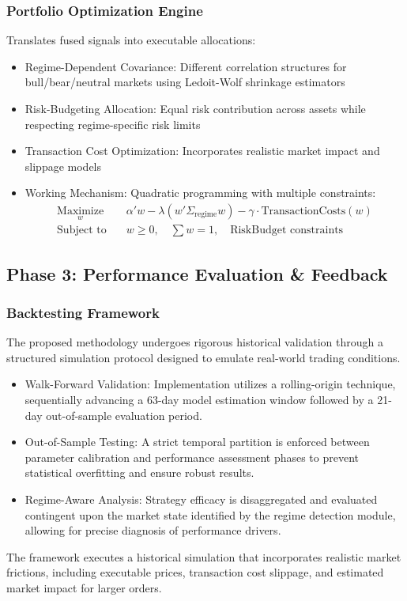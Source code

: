 \documentclass{singlecol-new}
\theoremstyle{TH}{
\newtheorem{lemma}{Lemma}
\newtheorem{theorem}[lemma]{Theorem}
\newtheorem{corrolary}[lemma]{Corrolary}
\newtheorem{conjecture}[lemma]{Conjecture}
\newtheorem{proposition}[lemma]{Proposition}
\newtheorem{claim}[lemma]{Claim}
\newtheorem{stheorem}[lemma]{Wrong Theorem}
\newtheorem{algorithm}{Algorithm}
}
\theoremstyle{THrm}{
\newtheorem{definition}{Definition}[section]
\newtheorem{question}{Question}[section]
\newtheorem{remark}{Remark}
\newtheorem{scheme}{Scheme}
}
\theoremstyle{THhit}{
\newtheorem{case}{Case}[section]
}
\begin{document}
\subsubsection{Portfolio Optimization Engine}

Translates fused signals into executable allocations:
\begin{itemize}
    \item Regime-Dependent Covariance: Different correlation structures for bull/bear/neutral markets using Ledoit-Wolf shrinkage estimators
    \item Risk-Budgeting Allocation: Equal risk contribution across assets while respecting regime-specific risk limits
    \item Transaction Cost Optimization: Incorporates realistic market impact and slippage models
    \item Working Mechanism: Quadratic programming with multiple constraints:
    \begin{align}
\underset{w}{\text{Maximize}} \quad & \alpha'w - \lambda(w'\Sigma_{\text{regime}} w) - \gamma \cdot \text{TransactionCosts}(w) \\
\text{Subject to} \quad & w \geq 0, \quad \sum w = 1, \quad \text{RiskBudget constraints}
\end{align}
\end{itemize}



\subsection{Phase 3: Performance Evaluation \& Feedback}
\subsubsection{Backtesting Framework}
The proposed methodology undergoes rigorous historical validation through a structured simulation protocol designed to emulate real-world trading conditions.
\begin{itemize}
    \item Walk-Forward Validation: Implementation utilizes a rolling-origin technique, sequentially advancing a 63-day model estimation window followed by a 21-day out-of-sample evaluation period.
    \item Out-of-Sample Testing: A strict temporal partition is enforced between parameter calibration and performance assessment phases to prevent statistical overfitting and ensure robust results.
    \item Regime-Aware Analysis: Strategy efficacy is disaggregated and evaluated contingent upon the market state identified by the regime detection module, allowing for precise diagnosis of performance drivers.
\end{itemize}
The framework executes a historical simulation that incorporates realistic market frictions, including executable prices, transaction cost slippage, and estimated market impact for larger orders.
\end{document}
